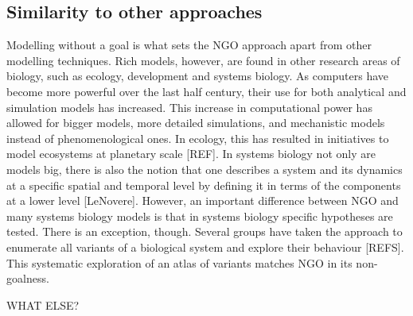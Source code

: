 \subsection{Similarity to other approaches}

Modelling without a goal is what sets the NGO approach apart from other modelling techniques. Rich models, however, are found in other research areas of biology, such as ecology, development and systems biology. As computers have become more powerful over the last half century, their use for both analytical and simulation models has increased. This increase in computational power has allowed for bigger models, more detailed simulations, and mechanistic models instead of phenomenological ones. In ecology, this has resulted in initiatives to model ecosystems at planetary scale [REF]. In systems biology not only are models big, there is also the notion that one describes a system and its dynamics at a specific spatial and temporal level by defining it in terms of the components at a lower level [LeNovere]. However, an important difference between NGO and many systems biology models is that in systems biology specific hypotheses are tested. There is an exception, though. Several groups have taken the approach to enumerate all variants of a biological system and explore their behaviour [REFS]. This systematic exploration of an atlas of variants matches NGO in its non-goalness.

WHAT ELSE?